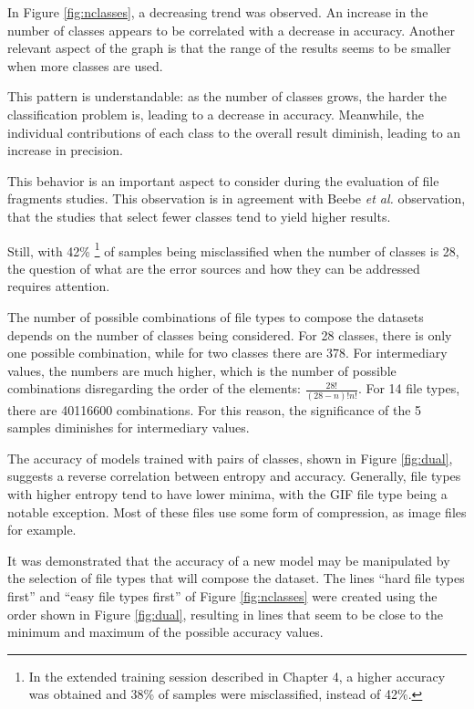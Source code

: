 
In Figure \ref{fig:nclasses}, a decreasing trend was observed. An increase in the number of classes appears to be correlated with a decrease in accuracy. Another relevant aspect of the graph is that the range of the results seems to be smaller when more classes are used.  

This pattern is understandable: as the number of classes grows, the harder the classification problem is, leading to a decrease in accuracy. Meanwhile, the individual contributions of each class to the overall result diminish, leading to an increase in precision.

This behavior is an important aspect to consider during the evaluation of file fragments studies. This observation is in agreement with Beebe \textit{et al.} \cite{beebe_sceadan:_2013} observation, that the studies that select fewer classes tend to yield higher results. 

Still, with 42\% \footnote{In the extended training session described in Chapter 4, a higher accuracy was obtained and 38\% of samples were misclassified, instead of 42\%.} of samples being misclassified when the number of classes is 28, the question of what are the error sources and how they can be addressed requires attention.

The number of possible combinations of file types to compose the datasets depends on the number of classes being considered. For 28 classes, there is only one possible combination, while for two classes there are 378. For intermediary values, the numbers are much higher, which is the number of possible combinations disregarding the order of the elements: $ \frac{28!}{(28-n)!n!}$. For 14 file types, there are 40116600 combinations. For this reason, the significance of the 5 samples diminishes for intermediary values.


The accuracy of models trained with pairs of classes, shown in Figure \ref{fig:dual}, suggests a reverse correlation between entropy and accuracy. Generally, file types with higher entropy tend to have lower minima, with the GIF file type being a notable exception. Most of these files use some form of compression, as image files for example.

It was demonstrated that the accuracy of a new model may be manipulated by the selection of file types that will compose the dataset. The lines ``hard file types first'' and ``easy file types first'' of Figure \ref{fig:nclasses} were created using the order shown in Figure \ref{fig:dual}, resulting in lines that seem to be close to the minimum and maximum of the possible accuracy values. 

